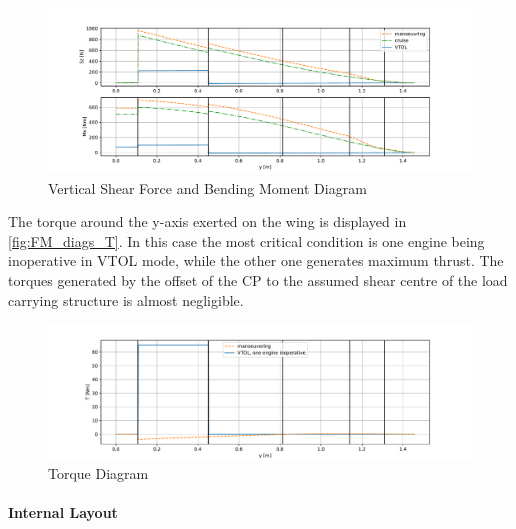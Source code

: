 \begin{figure}[H]
    \centering
    \includegraphics[width=1.0\textwidth]{Structures/Figures/FM_diags_z}
    \caption{Vertical Shear Force and Bending Moment Diagram}
    \label{fig:FM_diags_z}
\end{figure}

The torque around the y-axis exerted on the wing is displayed in \autoref{fig:FM_diags_T}. In this case the most critical condition is one engine being inoperative in VTOL mode, while the other one generates maximum thrust. The torques generated by the offset of the CP  to the assumed shear centre of the load carrying structure is almost negligible.

\begin{figure}[H]
    \centering
    \includegraphics[width=1.0\textwidth]{Structures/Figures/FM_diags_T}
    \caption{Torque Diagram}
    \label{fig:FM_diags_T}
\end{figure}

\paragraph{Internal Layout}

